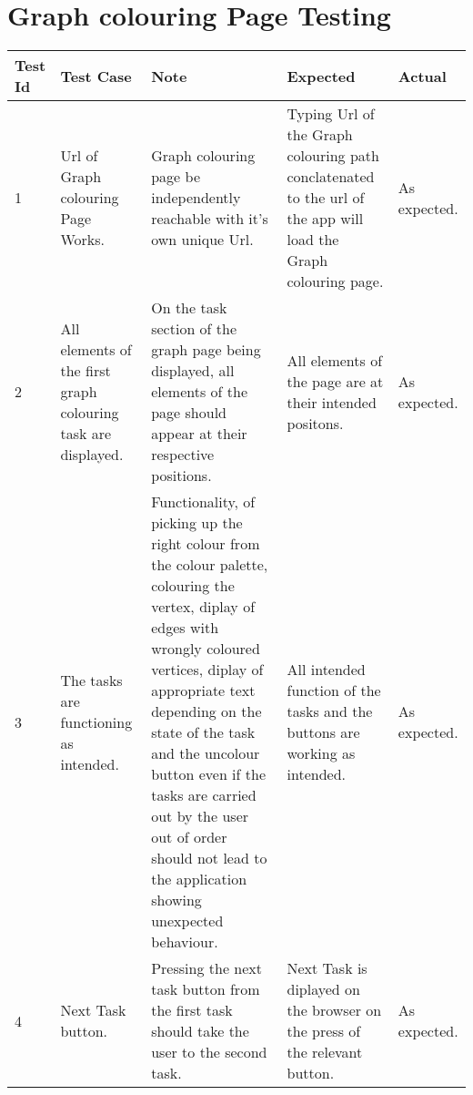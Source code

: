 \section{Graph colouring Page Testing}
\begin{tabular}{ |p{1cm}|p{2cm}|p{4cm}|p{2cm}|p{2cm}| }
 \hline
 \textbf{Test Id} & \textbf{Test Case} & \textbf{Note} & \textbf{Expected} & \textbf{Actual} \\
 \hline
 1 
 & Url of Graph colouring Page Works. 
 & Graph colouring page be independently reachable with it's own unique
   Url.
 & Typing Url of the Graph colouring path conclatenated to the url of the app will load the
   Graph colouring page.
 & As expected. \\
 \hline
 2 
 & All elements of the first graph colouring task are displayed.
 & On the task section of the graph page being displayed, all elements of
   the page should appear at their respective positions.
 & All elements of the page are at their intended positons.
 & As expected. \\
 \hline
 3 
 & The tasks are functioning as intended. 
 & Functionality, of picking up the right colour from the colour palette,
   colouring the vertex, diplay of edges with wrongly coloured vertices, diplay of
   appropriate text depending on the state of the task and the uncolour button
   even if the tasks are carried out by the user out of order should not lead to
   the application showing unexpected behaviour.
 & All intended function of the tasks and the buttons are working as intended. 
 & As expected. \\
 \hline
 4 
 & Next Task button.
 & Pressing the next task button from the first task
   should take the user to the second task.
 & Next Task is diplayed on the browser on the press of the relevant button.
 & As expected. \\
 \hline
\end{tabular}

